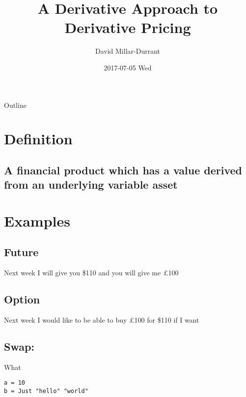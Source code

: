\documentclass[bigger]{beamer}
\author{David Millar-Durrant}
\date{2017-07-05 Wed}
\title{A Derivative Approach to Derivative Pricing}
\begin{document}
\maketitle
\begin{frame}{Outline}
\tableofcontents
\end{frame}

\section{Definition}
\label{sec:org186b2cb}
\subsection{A financial product which has a value derived from an underlying variable asset}
\label{sec:org9fb70fb}
\section{Examples}
\label{sec:org2a08d53}
\subsection{Future}
\label{sec:orga1befb9}
\begin{frame}[label={sec:org2549908}]{Next week I will give you \$110 and you will give me £100}
\end{frame}
\subsection{Option}
\label{sec:orgfe66c39}
\begin{frame}[label={sec:orga8f0219}]{Next week I would like to be able to buy £100 for \$110 if I want}
\end{frame}
\subsection{Swap:}
\label{sec:orgc6dd7cb}
\begin{frame}[fragile,label={sec:org88088cf}]{What}
 \begin{verbatim}
a = 10
b = Just "hello" "world"
\end{verbatim}
\end{frame}
\end{document}
